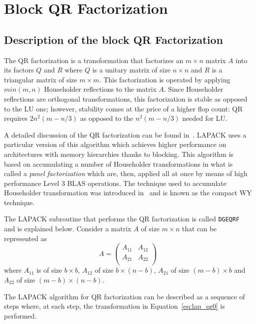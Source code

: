 \documentclass[runningheads]{llncs}
\begin{document}
\section{Block QR Factorization}
\label{sec:lapack}

\subsection{Description of the block QR Factorization}

The QR factorization is a transformation that factorizes an $m \times
n$ matrix $A$ into its factors $Q$ and $R$ where $Q$ is a unitary
matrix of size $n \times n$ and $R$ is a triangular matrix of size $m
\times m$. This factorization is operated by applying $min(m,n)$ Householder
reflections to the matrix $A$. Since Householder reflections are
orthogonal transformations, this factorization is stable as opposed to
the LU one; however, stability comes at the price of a higher flop
count: QR requires $2n^2(m-n/3)$ as opposed to the $n^2(m-n/3)$ needed for LU. 

A detailed discussion of the QR factorization can be found in~\cite{golubvanloan,trefethenbau,stew:98}. LAPACK uses a particular version of this algorithm which achieves higher performance on architectures with memory hierarchies thanks to blocking. This algorithm is based on accumulating a number of Householder transformations in what is called a {\it panel factorization} which are, then, applied all at once by means of high performance Level 3 BLAS operations. The technique used to accumulate Householder transformation was introduced in~\cite{64889} and is known as the compact WY technique.

The LAPACK subroutine that performs the QR factorization is called
\texttt{DGEQRF} and is explained below.
Consider a matrix $A$ of size $m \times n$ that can be represented as
\begin{displaymath}
  A=\left(\begin{array}{cc}
    A_{11} & A_{12}  \\
    A_{21} & A_{22}  \\
  \end{array}\right)
\end{displaymath}
where $A_{11}$ is of size $b \times b$, $A_{12}$ of size $b \times
(n-b)$, $A_{21}$ of size $(m-b) \times b$ and $A_{22}$ of size $(m-b)
\times (n-b)$.

The LAPACK algorithm for QR factorization can be described as a
sequence of steps where, at each step, the transformation in
Equation~\eqref{eq:lap_qr0} is performed.
\end{document}
